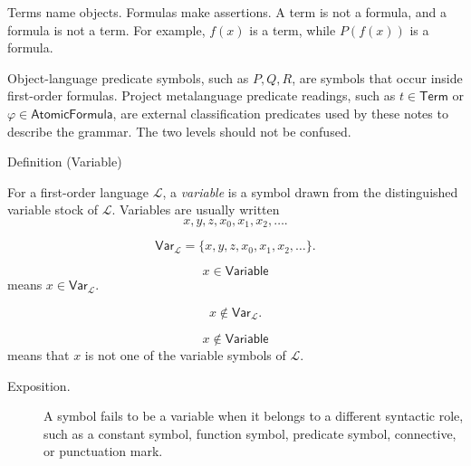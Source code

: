 \begin{remark*}
Terms name objects. Formulas make assertions. A term is not a formula, and a
formula is not a term. For example, \(f(x)\) is a term, while \(P(f(x))\) is a
formula.
\end{remark*}

\begin{remark*}
Object-language predicate symbols, such as \(P,Q,R\), are symbols that occur
inside first-order formulas. Project metalanguage predicate readings, such as
\(t\in\mathsf{Term}\) or \(\varphi\in\mathsf{AtomicFormula}\), are
external classification predicates used by these notes to describe the grammar.
The two levels should not be confused.
\end{remark*}

\begin{definitionbox}{Definition (Variable)}
\begin{definition}[Variable]
\label{def:variable}
For a first-order language \(\mathcal L\), a \emph{variable} is a symbol drawn
from the distinguished variable stock of \(\mathcal L\). Variables are usually
written
\[
x,y,z,x_0,x_1,x_2,\ldots .
\]
\end{definition}
\end{definitionbox}

\begin{remark*}
\[
\mathsf{Var}_{\mathcal L}=\{x,y,z,x_0,x_1,x_2,\ldots\}.
\]
\end{remark*}

\begin{remark*}
\[
  x\in\mathsf{Variable}
\] means \(x\in\mathsf{Var}_{\mathcal L}\).
\end{remark*}

\begin{remark*}
\[
x\notin\mathsf{Var}_{\mathcal L}.
\]
\end{remark*}

\begin{remark*}
\[
  x\notin\mathsf{Variable}
\] means that \(x\) is not one of the variable
symbols of \(\mathcal L\).
\end{remark*}

\begin{remark*}
\begin{description}
  \item[Exposition.] A symbol fails to be a variable when it belongs to a different syntactic role,
such as a constant symbol, function symbol, predicate symbol, connective, or
punctuation mark.
\end{description}
\end{remark*}

